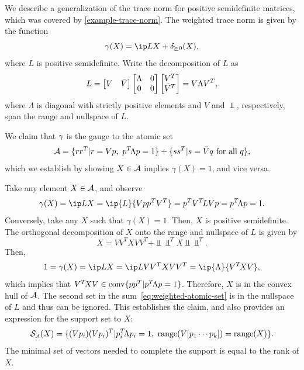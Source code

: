   \begin{example} \label{example-weighted-trace-norm} 
    We describe a generalization of
    the trace norm for positive semidefinite matrices, which was covered
    by \autoref{example-trace-norm}. The weighted trace norm is given by
    the function
    \[
      \gamma(X) = \ip L X + \delta_{\succeq0}(X),
    \]
    where $L$ is positive semidefinite. Write the decomposition of $L$
    as
    \[
      L = \bmat{V & \Vbar}\bmat{\Lambda & 0\\0 & 0}\bmat{V^T\\\Vbar^T}
        = V \Lambda V^T,
    \]
    where $\Lambda$ is diagonal with strictly positive elements and $V$
    and $\Vbar$, respectively, span the range and nullspace of $L$.
  
    We claim that $\gamma$ is the gauge to the atomic set
    \begin{equation} \label{eq:weighted-atomic-set}
      \Ascr = \{rr^T | r = Vp,\ p\T\Lambda p=1\}
            + \{ss^T | s = \Vbar q \mbox{ for all } q\},
     \end{equation}
     which we establish by showing $X\in\mathcal{A}$ implies
     $\gamma(X)=1$, and vice versa.
    
     Take any element $X\in\mathcal{A}$, and observe
     \[
       \gamma(X) = \ip L X = \ip{L}{Vpp^T V^T} = p^T V\T L V p = p\T\Lambda p = 1.
     \]
     Conversely, take any $X$ such that $\gamma(X)=1$. Then, $X$ is positive
     semidefinite. The orthogonal decomposition of $X$ onto the range and
     nullspace of $L$ is given by
     \[
       X = VV^T X VV^T + \Vbar\Vbar^T X \Vbar\Vbar^T.
     \]
     Then,
     \begin{align*}
       1=\gamma(X) = \ip L X
       = \ip L {VV^T X VV^T}
       = \ip{\Lambda}{V\T X V},
     \end{align*}
     which implies that
     $V^T\! X V \in \operatorname{conv}\{pp^T| p^T\!\Lambda p = 1\}$.  Therefore, $X$
     is in the convex hull of $\mathcal{A}$.  The second set in the
     sum~\eqref{eq:weighted-atomic-set} is in the nullspace of $L$ and
     thus can be ignored. This establishes the claim, and also provides
     an expression for the support set to $X$:
     \[
       \mathcal{S}_{\scriptscriptstyle\mathcal{A}}(X) = \{(Vp_i)(Vp_i)^T | p_i^T\!\Lambda p_i=1,\ \operatorname{range}(V[p_1\cdots p_k])=\operatorname{range}(X)\}.
     \]
     The minimal set of vectors needed to complete the support
     is equal to the rank of $X$.
  

\end{example}
